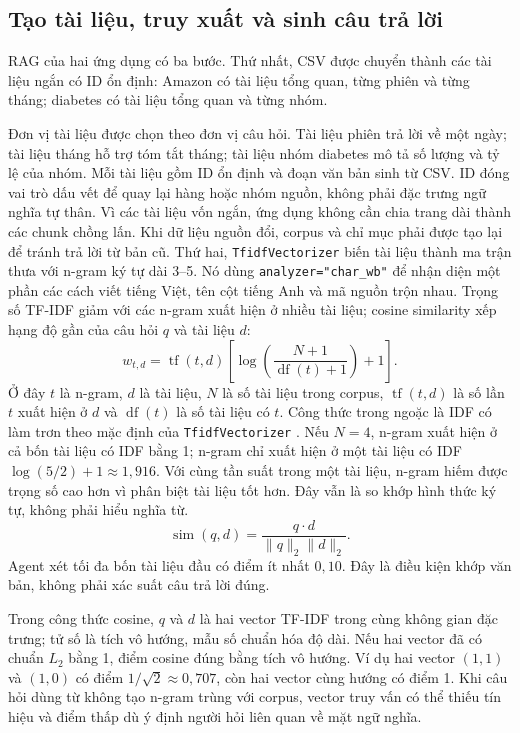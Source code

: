 \documentclass[12pt,a4paper]{report}
\begin{document}
\subsection{Tạo tài liệu, truy xuất và sinh câu trả lời}
RAG của hai ứng dụng có ba bước. Thứ nhất, CSV được chuyển thành các tài liệu ngắn có ID ổn định:
Amazon có tài liệu tổng quan, từng phiên và từng tháng; diabetes có tài liệu tổng quan và từng nhóm.

Đơn vị tài liệu được chọn theo đơn vị câu hỏi. Tài liệu phiên trả lời về một ngày; tài liệu tháng hỗ trợ tóm tắt tháng; tài liệu nhóm diabetes mô tả số lượng và tỷ lệ của nhóm. Mỗi tài liệu gồm ID ổn định và đoạn văn bản sinh từ CSV. ID đóng vai trò dấu vết để quay lại hàng hoặc nhóm nguồn, không phải đặc trưng ngữ nghĩa tự thân. Vì các tài liệu vốn ngắn, ứng dụng không cần chia trang dài thành các chunk chồng lấn. Khi dữ liệu nguồn đổi, corpus và chỉ mục phải được tạo lại để tránh trả lời từ bản cũ.
Thứ hai, \texttt{TfidfVectorizer} biến tài liệu thành ma trận thưa với n-gram ký tự dài 3--5.
Nó dùng \texttt{analyzer="char\_wb"} để nhận diện một phần các cách viết tiếng Việt, tên cột
tiếng Anh và mã nguồn trộn nhau. Trọng số TF-IDF giảm với các n-gram xuất hiện ở nhiều tài liệu;
cosine similarity xếp hạng độ gần của câu hỏi $q$ và tài liệu $d$:
\begin{equation}
w_{t,d}=\operatorname{tf}(t,d)\left[\log\!\left(\frac{N+1}{\operatorname{df}(t)+1}\right)+1\right].
\end{equation}
Ở đây $t$ là n-gram, $d$ là tài liệu, $N$ là số tài liệu trong corpus, $\operatorname{tf}(t,d)$ là số lần $t$ xuất hiện ở $d$ và $\operatorname{df}(t)$ là số tài liệu có $t$. Công thức trong ngoặc là IDF có làm trơn theo mặc định của \texttt{TfidfVectorizer} \cite{essay03-sklearn-tfidf}. Nếu $N=4$, n-gram xuất hiện ở cả bốn tài liệu có IDF bằng 1; n-gram chỉ xuất hiện ở một tài liệu có IDF $\log(5/2)+1\approx1{,}916$. Với cùng tần suất trong một tài liệu, n-gram hiếm được trọng số cao hơn vì phân biệt tài liệu tốt hơn. Đây vẫn là so khớp hình thức ký tự, không phải hiểu nghĩa từ.
\begin{equation}
\operatorname{sim}(q,d)=\frac{q\cdot d}{\lVert q\rVert_2\lVert d\rVert_2}.
\end{equation}
Agent xét tối đa bốn tài liệu đầu có điểm ít nhất $0{,}10$. Đây là điều kiện khớp văn bản, không
phải xác suất câu trả lời đúng.

Trong công thức cosine, $q$ và $d$ là hai vector TF-IDF trong cùng không gian đặc trưng; tử số là tích vô hướng, mẫu số chuẩn hóa độ dài. Nếu hai vector đã có chuẩn $L_2$ bằng 1, điểm cosine đúng bằng tích vô hướng. Ví dụ hai vector $(1,1)$ và $(1,0)$ có điểm $1/\sqrt2\approx0{,}707$, còn hai vector cùng hướng có điểm 1. Khi câu hỏi dùng từ không tạo n-gram trùng với corpus, vector truy vấn có thể thiếu tín hiệu và điểm thấp dù ý định người hỏi liên quan về mặt ngữ nghĩa.
\end{document}
